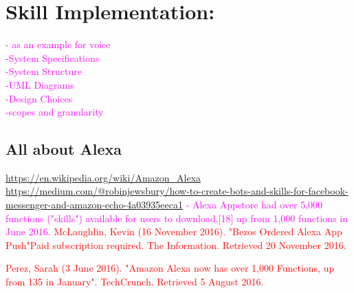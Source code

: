 \chapter{Skill Implementation: }
\label{mainone}

\textcolor{magenta}{
- as an example for voice\\
-System Specifications\\
-System Structure\\
-UML Diagrams\\
-Design Choices\\
-scopes and granularity
}

\section{All about Alexa}
\url{https://en.wikipedia.org/wiki/Amazon_Alexa}
\url{https://medium.com/@robinjewsbury/how-to-create-bots-and-skills-for-facebook-messenger-and-amazon-echo-4a03935eeca1}
\textcolor{magenta}{
- Alexa Appstore had over 5,000 functions ("skills") available for users to download,[18] up from 1,000 functions in June 2016.
}
\textcolor{red}{McLaughlin, Kevin (16 November 2016). "Bezos Ordered Alexa App Push"Paid subscription required. The Information. Retrieved 20 November 2016.}

\textcolor{red}{Perez, Sarah (3 June 2016). "Amazon Alexa now has over 1,000 Functions, up from 135 in January". TechCrunch. Retrieved 5 August 2016.}

